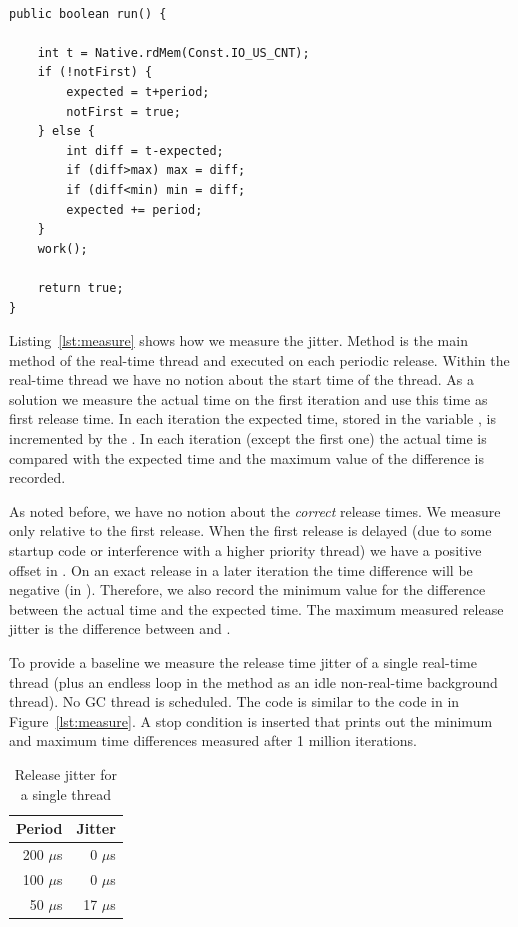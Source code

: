\begin{lstlisting}[float, caption={Measuring release time jitter},
label=lst:measure]

public boolean run() {

    int t = Native.rdMem(Const.IO_US_CNT);
    if (!notFirst) {
        expected = t+period;
        notFirst = true;
    } else {
        int diff = t-expected;
        if (diff>max) max = diff;
        if (diff<min) min = diff;
        expected += period;
    }
    work();

    return true;
}
\end{lstlisting}

Listing~\ref{lst:measure} shows how we measure the jitter. Method
 is the main method of the real-time thread and executed
on each periodic release. Within the real-time thread we have no
notion about the start time of the thread. As a solution we measure
the actual time on the first iteration and use this time as first
release time. In each iteration the expected time, stored in the
variable , is incremented by the . In
each iteration (except the first one) the actual time is compared
with the expected time and the maximum value of the difference is
recorded.

As noted before, we have no notion about the \emph{correct} release
times. We measure only relative to the first release. When the first
release is delayed (due to some startup code or interference with a
higher priority thread) we have a positive offset in
. On an exact release in a later iteration the time
difference will be negative (in ). Therefore, we also
record the minimum value for the difference between the actual time
and the expected time. The maximum measured release jitter is the
difference between  and .

To provide a baseline we measure the release time jitter of a single
real-time thread (plus an endless loop in the  method as
an idle non-real-time background thread). No GC thread is scheduled.
The code is similar to the code in in Figure~\ref{lst:measure}. A
stop condition is inserted that prints out the minimum and maximum
time differences measured after 1 million iterations.

\begin{table}
    \centering
    \begin{tabular}{rr}
    \toprule
    Period & Jitter \\
    \midrule
    200 $\mu$s & 0 $\mu$s \\
    100 $\mu$s & 0 $\mu$s \\
    50 $\mu$s & 17 $\mu$s \\
    \bottomrule
    \end{tabular}
    \caption{Release jitter for a single thread}
    \label{tab:single}
\end{table}

